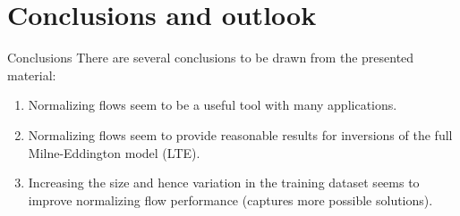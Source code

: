 \documentclass{beamer}
\begin{document}
\section{Conclusions and outlook}
\begin{frame}[allowframebreaks]{Conclusions}
There are several conclusions to be drawn from the presented material:
\begin{enumerate}
\item Normalizing flows seem to be a useful tool with many applications.
\item Normalizing flows seem to provide reasonable results for inversions of the full Milne-Eddington model (LTE).
\item Increasing the size and hence variation in the training dataset seems to improve normalizing flow performance (captures more possible solutions).
\end{enumerate}%
\end{frame}
\end{document}
